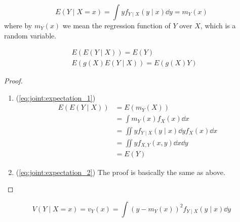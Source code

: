 \documentclass[12pt]{extarticle}
\begin{document}
\begin{definition}
    \begin{equation}
        E(Y \mid X = x) = \int y f_{Y  \mid  X}(y  \mid  x) \dd{y} = m_Y(x)
    \end{equation}
    where by $m_Y(x)$ we mean the regression function of $Y$ over $X$, which is a random variable.
\end{definition}

\begin{theorem}
    \label{thm:condition:prop_expectation}
    \begin{align}
         & E(E(Y \mid X)) = E(Y) \label{eq:joint:expectation_1}         \\
         & E(g(X)E(Y \mid X)) = E(g(X)Y) \label{eq:joint:expectation_2}
    \end{align}
\end{theorem}

\begin{proof}
    \skiplineafterproof
    \begin{enumerate}[label=\roman*.]
        \item (\autoref{eq:joint:expectation_1})
              \begin{align}
                  E(E(Y \mid X)) & = E(m_Y(X))                                           \\
                                 & = \int m_Y(x) f_X(x) \dd{x}                           \\
                                 & = \iint y f_{Y \mid X}(y \mid x) \dd{y} f_X(x) \dd{x} \\
                                 & = \iint y f_{X, Y}(x, y) \dd{x} \dd{y}                \\
                                 & = E(Y)
              \end{align}
        \item (\autoref{eq:joint:expectation_2}) The proof is basically the same as above.
    \end{enumerate}
\end{proof}

\begin{definition}
    \begin{equation}
        V(Y  \mid  X = x) = v_Y(x) = \int \left(y - m_Y(x) \right)^2 f_{Y \mid X}(y \mid x) \dd{y}
    \end{equation}
\end{definition}
\end{document}
